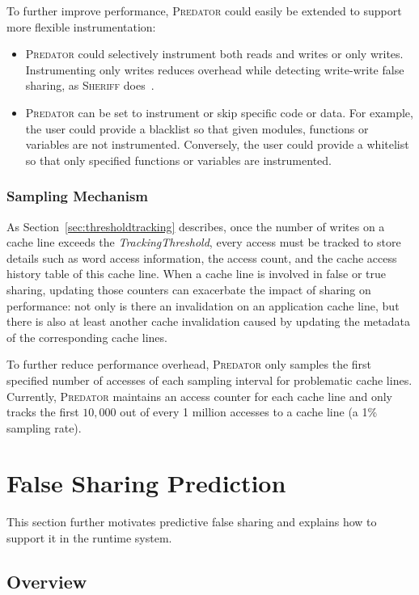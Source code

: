 \documentclass[10pt]{sigplanconf}
\newcommand{\Sheriff}{{\scshape Sheriff}}
\newcommand{\Predator}{{\scshape Predator}}
\begin{document}
To further improve performance,
\Predator{} could easily be extended to support more flexible instrumentation:
\begin{itemize}
\item
\Predator{} could selectively instrument both reads and writes or only writes.
Instrumenting only writes reduces overhead while detecting write-write false sharing, 
as \Sheriff{} does~\cite{sheriff}.
\item
\Predator{} can be set to instrument or skip specific code or data. 
For example, the user could provide a blacklist so that given modules,
functions or variables are not instrumented. 
Conversely, the user could provide a whitelist so that only specified functions or variables are instrumented. 
\end{itemize}

\subsubsection{Sampling Mechanism}
\label{sec:sample}
As Section~\ref{sec:thresholdtracking} describes, once the number of
writes on a cache line exceeds the {\it TrackingThreshold}, every
access must be tracked to store details such as word access
information, the access count, and the cache access history table
of this cache line.  When a cache line is involved in false or true
sharing, updating those counters can exacerbate the impact of sharing
on performance: not only is there an invalidation on an application
cache line, but there is also at least another cache invalidation
caused by updating the metadata of the corresponding cache lines.

To further reduce performance overhead, \Predator{} only samples the first specified
number of accesses of each sampling interval for problematic cache lines. 
Currently, \Predator{} maintains an access counter for each cache line
and only tracks the first $10,000$ out of every 1 million
accesses to a cache line (a 1\% sampling rate).

\section{False Sharing Prediction}
\label{sec:prediction}
This section further motivates predictive false sharing and explains how to support it in the runtime system.  

\subsection{Overview}
\label{sec:predictoverview}
\end{document}
